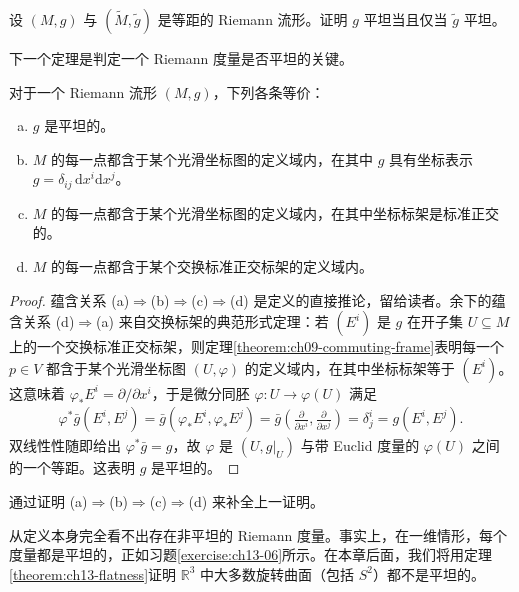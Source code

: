 \documentclass[../../main.tex]{subfiles}
\begin{document}
\begin{exercise}\label{exercise:ch13-13}
设 $(M,g)$ 与 $(\widetilde M,\widetilde g)$ 是等距的 Riemann 流形。证明 $g$ 平坦当且仅当 $\widetilde g$ 平坦。
\end{exercise}

下一个定理是判定一个 Riemann 度量是否平坦的关键。

\begin{theorem}\label{theorem:ch13-flatness}
对于一个 Riemann 流形 $(M,g)$，下列各条等价：
\begin{enumerate}[(a)]
\item $g$ 是平坦的。
\item $M$ 的每一点都含于某个光滑坐标图的定义域内，在其中 $g$ 具有坐标表示 $g=\delta_{ij}\,\mathrm{d}x^i\mathrm{d}x^j$。
\item $M$ 的每一点都含于某个光滑坐标图的定义域内，在其中坐标标架是标准正交的。
\item $M$ 的每一点都含于某个交换标准正交标架的定义域内。
\end{enumerate}
\end{theorem}

\begin{proof}
蕴含关系 (a)$\Rightarrow$(b)$\Rightarrow$(c)$\Rightarrow$(d) 是定义的直接推论，留给读者。余下的蕴含关系 (d)$\Rightarrow$(a) 来自交换标架的典范形式定理：若 $(E^i)$ 是 $g$ 在开子集 $U\subseteq M$ 上的一个交换标准正交标架，则定理\ref{theorem:ch09-commuting-frame}表明每一个 $p\in V$ 都含于某个光滑坐标图 $(U,\varphi)$ 的定义域内，在其中坐标标架等于 $(E^i)$。这意味着 $\varphi_*E^i=\partial/\partial x^i$，于是微分同胚 $\varphi:U\to\varphi(U)$ 满足
\begin{align*}
\varphi^*\bar g(E^i,E^j)=\bar g(\varphi_*E^i,\varphi_*E^j)
=\bar g\!\left(\frac{\partial}{\partial x^i},\frac{\partial}{\partial x^j}\right)
=\delta^i_j=g(E^i,E^j).
\end{align*}
双线性性随即给出 $\varphi^*\bar g=g$，故 $\varphi$ 是 $(U,g|_U)$ 与带 Euclid 度量的 $\varphi(U)$ 之间的一个等距。这表明 $g$ 是平坦的。
\end{proof}

\begin{exercise}\label{exercise:ch13-15}
通过证明 (a)$\Rightarrow$(b)$\Rightarrow$(c)$\Rightarrow$(d) 来补全上一证明。
\end{exercise}

从定义本身完全看不出存在非平坦的 Riemann 度量。事实上，在一维情形，每个度量都是平坦的，正如习题\ref{exercise:ch13-06}所示。在本章后面，我们将用定理\ref{theorem:ch13-flatness}证明 $\mathbb{R}^3$ 中大多数旋转曲面（包括 $S^2$）都不是平坦的。
\end{document}
